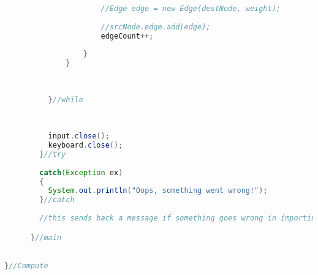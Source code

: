 \documentclass[letterpaper, 10pt]{article}
\begin{document}
\begin{lstlisting}[language = java]
	    			  
	    			  //Edge edge = new Edge(destNode, weight);
	    			  
	    			  //srcNode.edge.add(edge);
	    			  edgeCount++;
	    			  
	    		  }
	    	  } 
	    	  
	    	  
	    	  
	      }//while
	     
	      
	   
	      input.close();
	      keyboard.close();
	    }//try
	    
	    catch(Exception ex)
	    {
	      System.out.println("Oops, something went wrong!");
	    }//catch
	    
	    //this sends back a message if something goes wrong in importing the text into the array from magic items

	  }//main
	

}//Compute




\end{lstlisting}
\end{document}
